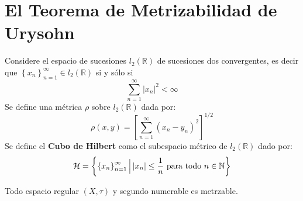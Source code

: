\documentclass[12pt]{report}
\theoremstyle{largebreak}
\newcommand\abs[1]{\ensuremath{\left|#1\right|}}
\begin{document}
    \section{El Teorema de Metrizabilidad de Urysohn}

    \begin{mydef}
        Considere el espacio de sucesiones $l_2(\mathbb{R})$ de sucesiones dos convergentes, es decir que $\left\{x_n \right\}_{ n=1}^\infty\in l_2(\mathbb{R})$ si y sólo si
        \begin{equation*}
            \sum_{ n=1}^\infty\abs{x_n}^2<\infty
        \end{equation*}
        Se define una métrica $\rho$ sobre $l_2(\mathbb{R})$ dada por:
        \begin{equation*}
            \rho(x,y)=\left[\sum_{ n=1}^\infty(x_n-y_n)^2\right]^{1/2}
        \end{equation*}
        Se define el \textbf{Cubo de Hilbert} como el subespacio métrico de $l_2(\mathbb{R})$ dado por:
        \begin{equation*}
            \mathcal{H}=\left\{\left\{x_n \right\}_{ n=1}^\infty\Big|\abs{x_n}\leq\frac{1}{n}\textup{ para todo }n\in\mathbb{N} \right\}
        \end{equation*}
    \end{mydef}

    \begin{theor}
        Todo espacio regular $(X,\tau)$ y segundo numerable es metrzable.
    \end{theor}
\end{document}
